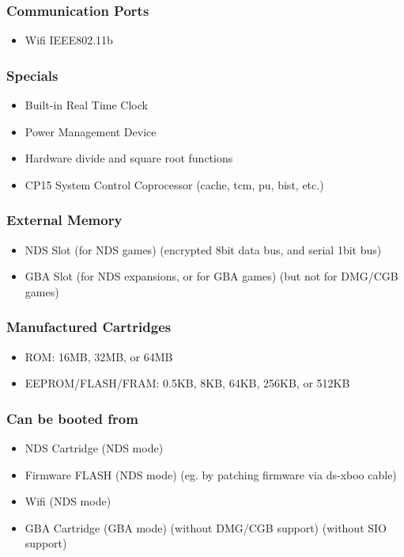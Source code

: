 \documentclass[11pt,a4paper]{proc}
\begin{document}
\begin{flushleft}
\subsubsection{Communication Ports}
\begin{itemize}
\item Wifi IEEE802.11b
\end{itemize}

\subsubsection{Specials}
\begin{itemize}
\item Built-in Real Time Clock
\item Power Management Device
\item Hardware divide and square root functions
\item CP15 System Control Coprocessor (cache, tcm, pu, bist, etc.)
\end{itemize}

\subsubsection{External Memory}
\begin{itemize}
\item NDS Slot (for NDS games) (encrypted 8bit data bus, and serial 1bit bus)
\item GBA Slot (for NDS expansions, or for GBA games) (but not for DMG/CGB games)
\end{itemize}

\subsubsection{Manufactured Cartridges}
\begin{itemize}
\item ROM: 16MB, 32MB, or 64MB
\item EEPROM/FLASH/FRAM: 0.5KB, 8KB, 64KB, 256KB, or 512KB
\end{itemize}

\subsubsection{Can be booted from}
\begin{itemize}
\item NDS Cartridge (NDS mode)
\item Firmware FLASH (NDS mode) (eg. by patching firmware via ds-xboo cable)
\item Wifi (NDS mode)
\item GBA Cartridge (GBA mode) (without DMG/CGB support) (without SIO support)
\end{itemize}


\end{flushleft}
\end{document}
